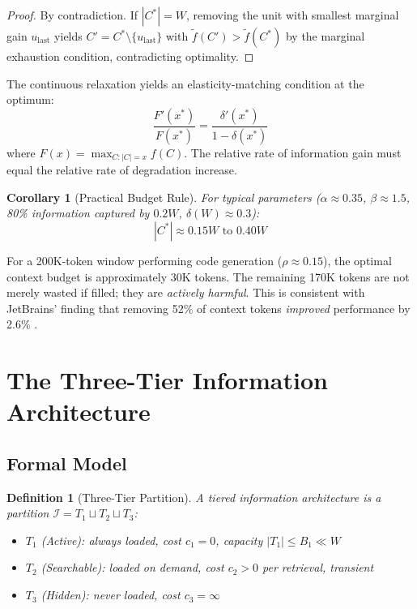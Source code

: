 \documentclass[11pt, a4paper, copyright]{googledeepmind}
\newtheorem{definition}{Definition}[section]
\newtheorem{corollary}{Corollary}[section]
\begin{document}
\begin{proof}
By contradiction. If $|C^*| = W$, removing the unit with smallest marginal gain $u_{\text{last}}$ yields $C' = C^* \setminus \{u_{\text{last}}\}$ with $\tilde{f}(C') > \tilde{f}(C^*)$ by the marginal exhaustion condition, contradicting optimality.
\end{proof}

The continuous relaxation yields an elasticity-matching condition at the optimum:
$$\frac{F'(x^*)}{F(x^*)} = \frac{\delta'(x^*)}{1 - \delta(x^*)}$$
where $F(x) = \max_{C:|C|=x} f(C)$. The relative rate of information gain must equal the relative rate of degradation increase.

\begin{corollary}[Practical Budget Rule]
\label{cor:budget}
For typical parameters ($\alpha \approx 0.35$, $\beta \approx 1.5$, 80\% information captured by $0.2W$, $\delta(W) \approx 0.3$):
$$|C^*| \approx 0.15W \text{ to } 0.40W$$
\end{corollary}

For a 200K-token window performing code generation ($\rho \approx 0.15$), the optimal context budget is approximately 30K tokens. The remaining 170K tokens are not merely wasted if filled; they are \emph{actively harmful}. This is consistent with JetBrains' finding that removing 52\% of context tokens \emph{improved} performance by 2.6\% \citep{jetbrains2025complexity}.


\section{The Three-Tier Information Architecture}
\label{sec:tiered}

\subsection{Formal Model}

\begin{definition}[Three-Tier Partition]
\label{def:tiers}
A tiered information architecture is a partition $\mathcal{I} = T_1 \sqcup T_2 \sqcup T_3$:
\begin{itemize}[nosep]
    \item $T_1$ (Active): always loaded, cost $c_1 = 0$, capacity $|T_1| \leq B_1 \ll W$
    \item $T_2$ (Searchable): loaded on demand, cost $c_2 > 0$ per retrieval, transient
    \item $T_3$ (Hidden): never loaded, cost $c_3 = \infty$
\end{itemize}
\end{definition}
\end{document}
